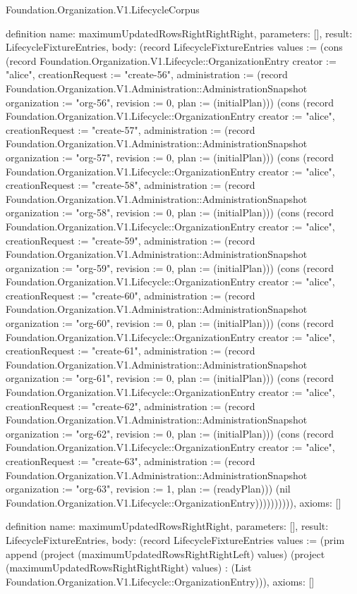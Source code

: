 \begin{lexlean}{Foundation.Organization.V1.LifecycleCorpus}
\begin{semanticmodule}
definition{
  name: maximumUpdatedRowsRightRightRight,
  parameters: [],
  result: LifecycleFixtureEntries,
  body: (record LifecycleFixtureEntries {values := (cons (record Foundation.Organization.V1.Lifecycle::OrganizationEntry {creator := "alice", creationRequest := "create-56", administration := (record Foundation.Organization.V1.Administration::AdministrationSnapshot {organization := "org-56", revision := 0, plan := (initialPlan)})}) (cons (record Foundation.Organization.V1.Lifecycle::OrganizationEntry {creator := "alice", creationRequest := "create-57", administration := (record Foundation.Organization.V1.Administration::AdministrationSnapshot {organization := "org-57", revision := 0, plan := (initialPlan)})}) (cons (record Foundation.Organization.V1.Lifecycle::OrganizationEntry {creator := "alice", creationRequest := "create-58", administration := (record Foundation.Organization.V1.Administration::AdministrationSnapshot {organization := "org-58", revision := 0, plan := (initialPlan)})}) (cons (record Foundation.Organization.V1.Lifecycle::OrganizationEntry {creator := "alice", creationRequest := "create-59", administration := (record Foundation.Organization.V1.Administration::AdministrationSnapshot {organization := "org-59", revision := 0, plan := (initialPlan)})}) (cons (record Foundation.Organization.V1.Lifecycle::OrganizationEntry {creator := "alice", creationRequest := "create-60", administration := (record Foundation.Organization.V1.Administration::AdministrationSnapshot {organization := "org-60", revision := 0, plan := (initialPlan)})}) (cons (record Foundation.Organization.V1.Lifecycle::OrganizationEntry {creator := "alice", creationRequest := "create-61", administration := (record Foundation.Organization.V1.Administration::AdministrationSnapshot {organization := "org-61", revision := 0, plan := (initialPlan)})}) (cons (record Foundation.Organization.V1.Lifecycle::OrganizationEntry {creator := "alice", creationRequest := "create-62", administration := (record Foundation.Organization.V1.Administration::AdministrationSnapshot {organization := "org-62", revision := 0, plan := (initialPlan)})}) (cons (record Foundation.Organization.V1.Lifecycle::OrganizationEntry {creator := "alice", creationRequest := "create-63", administration := (record Foundation.Organization.V1.Administration::AdministrationSnapshot {organization := "org-63", revision := 1, plan := (readyPlan)})}) (nil Foundation.Organization.V1.Lifecycle::OrganizationEntry)))))))))}),
  axioms: []
}

definition{
  name: maximumUpdatedRowsRightRight,
  parameters: [],
  result: LifecycleFixtureEntries,
  body: (record LifecycleFixtureEntries {values := (prim append (project (maximumUpdatedRowsRightRightLeft) values) (project (maximumUpdatedRowsRightRightRight) values) : (List Foundation.Organization.V1.Lifecycle::OrganizationEntry))}),
  axioms: []
}


\end{semanticmodule}
\end{lexlean}
